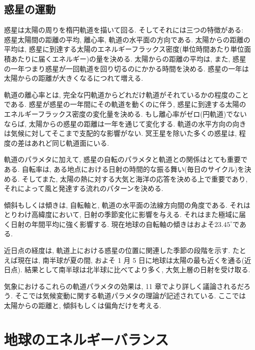 \documentclass[a4j,12pt,openbib,oneside,dvipdfmx]{jbook}
\begin{document}
\subsection{惑星の運動}
\par
惑星は太陽の周りを楕円軌道を描いて回る. そしてそれには三つの特徴がある: 惑星太陽間の距離の平均, 離心率, 軌道の水平面の方向である. 太陽からの距離の平均は, 惑星に到達する太陽のエネルギーフラックス密度(単位時間あたり単位面積あたりに届くエネルギー)の量を決める. 太陽からの距離の平均は, また, 惑星の一年つまり惑星が一回軌道を回り切るのにかかる時間を決める. 惑星の一年は太陽からの距離が大きくなるにつれて増える.
\par
軌道の離心率とは, 完全な円軌道からどれだけ軌道がそれているかの程度のことである. 惑星が惑星の一年間にその軌道を動くのに伴う, 惑星に到達する太陽のエネルギーフラックス密度の変化量を決める. 
もし離心率がゼロ(円軌道)でないならば, 太陽からの惑星の距離は一年を通じて変化する. 軌道の水平方向の向きは気候に対してそこまで支配的な影響がない. 冥王星を除いた多くの惑星は, 程度の差はあれど同じ軌道面にいる.
\par
軌道のパラメタに加えて, 惑星の自転のパラメタと軌道との関係はとても重要である. 自転率は, ある地点における日射の時間的な振る舞い(毎日のサイクル)を決める. 
そしてまた, 太陽の熱に対する大気と海洋の応答を決める上で重要であり, それによって風と発達する流れのパターンを決める.
\par
傾斜もしくは傾きは, 自転軸と, 軌道の水平面の法線方向間の角度である. それはとりわけ高緯度において, 日射の季節変化に影響を与える. それはまた極域に届く日射の年間平均に強く影響する. 現在地球の自転軸の傾きはおよそ$23.45^\circ$である.
\par
近日点の経度は, 軌道上における惑星の位置に関連した季節の段階を示す. たとえば現在は, 南半球が夏の間, およそ 1 月 5 日に地球は太陽の最も近くを通る(近日点). 結果として南半球は北半球に比べてより多く, 大気上層の日射を受け取る.
\par
気象におけるこれらの軌道パラメタの効果は, 11 章でより詳しく議論されるだろう. そこでは気候変動に関する軌道パラメタの理論が記述されている. ここでは太陽からの距離と, 傾斜もしくは偏角だけを考える.

\newpage
\section{地球のエネルギーバランス}
\end{document}
